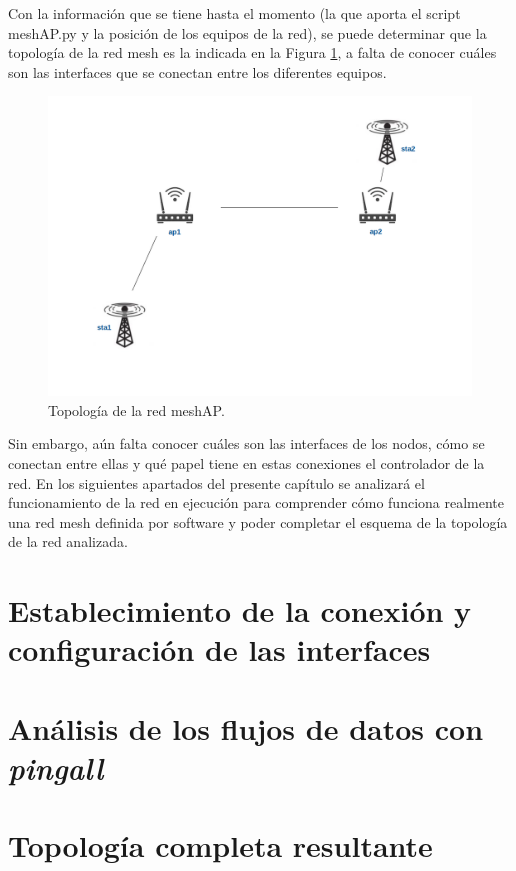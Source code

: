 \documentclass[a4paper,12pt,twoside,spanish]{book}
\begin{document}
Con la información que se tiene hasta el momento (la que aporta el script meshAP.py y la posición de los equipos de la red), se puede determinar que la topología de la red mesh es la indicada en la Figura \ref{fig:topo_inicial}, a falta de conocer cuáles son las interfaces que se conectan entre los diferentes equipos.\par

	\begin{figure}[!h]
		\centering
		\includegraphics[scale=.4]{Figuras/topo_inicial.png}
		\caption{Topología de la red meshAP.}
		\label{fig:topo_inicial}
	\end{figure}

Sin embargo, aún falta conocer cuáles son las interfaces de los nodos, cómo se conectan entre ellas y qué papel tiene en estas conexiones el controlador de la red. En los siguientes apartados del presente capítulo se analizará el funcionamiento de la red en ejecución para comprender cómo funciona realmente una red mesh definida por software y poder completar el esquema de la topología de la red analizada.\par

\section{Establecimiento de la conexión y configuración de las interfaces}

\section{Análisis de los flujos de datos con \textit{pingall}}

\section{Topología completa resultante}
\end{document}
